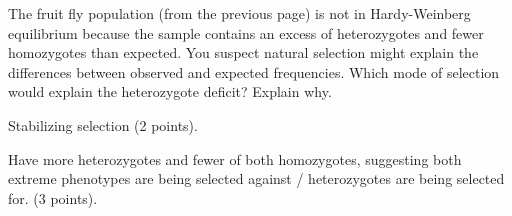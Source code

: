 \question[5]
The fruit fly population (from the previous page) is not in Hardy-Weinberg equilibrium because the sample contains an excess of heterozygotes and fewer homozygotes than expected.  You suspect natural selection might explain the differences between observed and expected frequencies.  Which mode of selection would explain the heterozygote deficit?  Explain why. 

\begin{solution}
Stabilizing selection (2 points). 

Have more heterozygotes and fewer of both homozygotes, suggesting both extreme phenotypes are being selected against / heterozygotes are being selected for. (3 points).

\end{solution}

